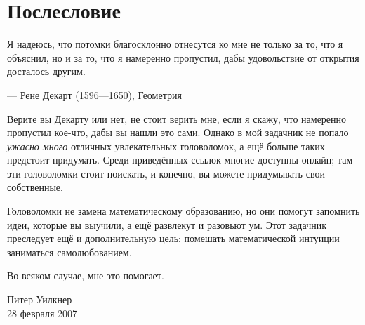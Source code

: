 \chapter{Послесловие}


\setlength{\epigraphwidth}{.83\textwidth}
\epigraph{Я надеюсь, что потомки благосклонно отнесутся ко мне не только за то, что я объяснил, но и за то, что я намеренно пропустил, дабы удовольствие от открытия досталось другим.}{--- Рене Декарт (1596---1650), Геометрия}


Верите вы Декарту или нет, не стоит верить мне, если я скажу, что намеренно пропустил кое-что, дабы вы нашли это сами.
Однако в мой задачник не попало \emph{ужасно много} отличных увлекательных головоломок, а ещё больше таких предстоит придумать.
Среди приведённых ссылок многие доступны онлайн; там эти головоломки стоит поискать, и конечно, вы можете придумывать свои собственные.

Головоломки не замена математическому образованию, но они помогут запомнить идеи, которые вы выучили, а ещё развлекут и разовьют ум.
Этот задачник преследует ещё и дополнительную цель:
помешать математической интуиции заниматься самолюбованием.

Во всяком случае, мне это помогает.

\begin{flushright}
Питер Уилкнер\\
28 февраля 2007
\end{flushright}
